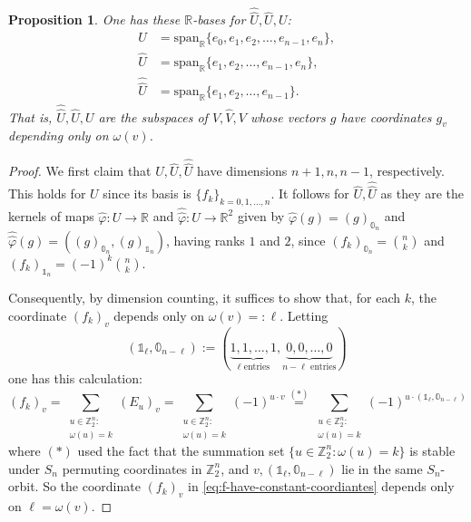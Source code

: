\documentclass[10pt]{amsart}
\theoremstyle{plain}
\newtheorem{proposition}[conjecture]{Proposition}
\newcommand{\zero}{\mathbb{0}}
\newcommand{\one}{\mathbb{1}}
\newcommand{\ZZ}{\mathbb{Z}}
\newcommand{\RR}{\mathbb{R}}
\newcommand{\spn}{\mathrm{span}}
\begin{document}
\begin{proposition}
\label{prop:leftover-space-identified}
One has these $\RR$-bases for $\hat{\hat{U}},\hat{U},U$:
\begin{align*}
U&=\spn_\RR\{e_0,e_1,e_2,\ldots,e_{n-1},e_n\},\\
\hat{U}&=\spn_\RR\{e_1,e_2,\ldots,e_{n-1},e_n\},\\
\hat{\hat{U}}&=\spn_\RR\{e_1,e_2,\ldots,e_{n-1}\}.
\end{align*}
That is, $\hat{\hat{U}},\hat{U},U$ are the subspaces of $\hat{\hat{V}},\hat{V},V$ whose vectors $g$ have coordinates $g_v$ depending only on $\omega(v)$.
\end{proposition}
\begin{proof}
We first claim that $U, \hat{U}, \hat{\hat{U}}$
have dimensions $n+1,n,n-1$, respectively. This holds
for $U$ since its basis is $\{f_k\}_{k=0,1,\ldots,n}$.
It follows for $\hat{U}, \hat{\hat{U}}$ as they are the kernels of maps
\( \hat{\varphi}:U\to \RR \)
and 
\( \hat{\hat{\varphi}}:U\to \RR^2 
\) 
given by
  \( \hat{\varphi}(g)= (g)_{\zero_n} \) and
  \( \hat{\hat{\varphi}}(g) = ((g)_{\zero_n},(g)_{\one_n}) \), 
having ranks $1$ and $2$,
since 
  \( (f_k)_{\zero_n}=\binom{n}{k} \) and
  \( (f_k)_{\one_n}=(-1)^k\binom{n}{k} \).
  
  Consequently, by dimension counting, it suffices to show that, for
  each $k$, the coordinate $(f_k)_v$ depends only on
  $\omega(v)=:\ell$. Letting
$$
(\one_\ell, \zero_{n-\ell}):=(\underbrace{1,1,\ldots,1}_{\ell\text{ entries}},
\underbrace{0,0,\ldots,0}_{n-\ell\text{ entries}})
$$
one has this calculation:
\begin{equation}
\label{eq:f-have-constant-coordiantes}
(f_k)_v 
=
\sum_{\substack{u \in \ZZ_2^n:\\\omega(u)=k}}
(E_u)_v 
=
\sum_{\substack{u \in \ZZ_2^n:\\\omega(u)=k}}
(-1)^{u \cdot v} 
\overset{(*)}{=}\sum_{\substack{u \in \ZZ_2^n:\\\omega(u)=k}}
(-1)^{u \cdot (\one_\ell,\zero_{n-\ell})}
\end{equation}
where \( (*) \) used the fact
that the summation set $\{u \in \ZZ_2^n: \omega(u)=k\}$ is stable under
$S_n$ permuting coordinates in $\ZZ_2^n$, and $v, (\one_\ell,\zero_{n-\ell})$ lie
 in the same $S_n$-orbit. 
So the coordinate $(f_k)_v$  in \eqref{eq:f-have-constant-coordiantes} depends only on $\ell=\omega(v)$.
\end{proof}
\end{document}
